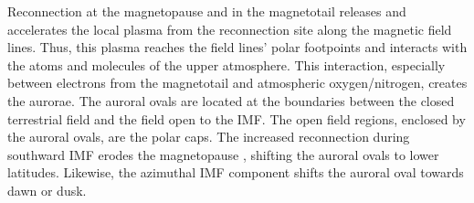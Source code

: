 Reconnection at the magnetopause and in the magnetotail releases and accelerates the local plasma from the reconnection site along the magnetic field lines. Thus, this plasma reaches the field lines' polar footpoints and interacts with the atoms and molecules of the upper atmosphere. This interaction, especially between electrons from the magnetotail and atmospheric oxygen/nitrogen, creates the aurorae. The auroral ovals are located at the boundaries between the closed terrestrial field and the field open to the IMF. The open field regions, enclosed by the auroral ovals, are the polar caps. The increased reconnection during southward IMF erodes the magnetopause \citep{Aubry1970}, shifting the auroral ovals to lower latitudes. Likewise, the azimuthal IMF component shifts the auroral oval towards dawn or dusk.

